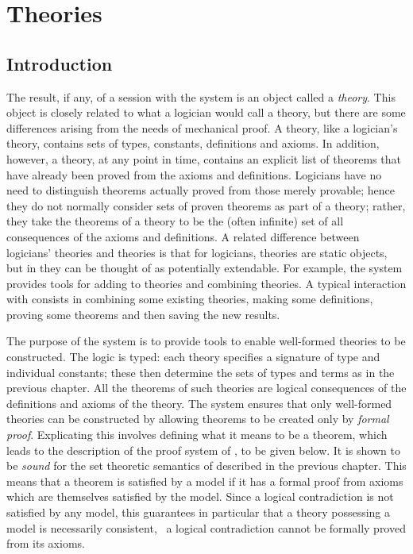 \chapter{Theories}\label{semantics}

\section{Introduction}

The result, if any, of a session with the \HOL{} system is an object
called a {\it theory\/}.  This object is closely related to what a
logician would call a theory, but there are some differences arising
from the needs of mechanical proof.  A \HOL{} theory, like a logician's
theory, contains sets of types, constants, definitions and axioms.  In
addition, however, a \HOL{} theory, at any point in time, contains an
explicit list of theorems that have already been proved from the
axioms and definitions. Logicians have no need to distinguish theorems
actually proved from those merely provable; hence they do not normally
consider sets of proven theorems as part of a theory; rather, they
take the theorems of a theory to be the (often infinite) set of all
consequences of the axioms and definitions.  A related difference
between logicians' theories and \HOL{} theories is that for logicians,
theories are static objects, but in \HOL{} they can be thought of as
potentially extendable. For example, the \HOL{} system provides tools
for adding to theories and combining theories.  A typical interaction
with \HOL{} consists in combining some existing theories, making some
definitions, proving some theorems and then saving the new results.

The purpose of the \HOL{} system is to provide tools to enable
well-formed theories to be constructed.  The \HOL{} logic is typed:
each theory specifies a signature of type and individual constants;
these then determine the sets of types and terms as in the previous
chapter.  All the theorems of such theories are logical consequences
of the definitions and axioms of the theory.  The \HOL{} system ensures
that only well-formed theories can be constructed by allowing theorems
to be created only by {\it formal proof\/}. Explicating this involves
defining what it means to be a theorem, which leads to the description
of the proof system of \HOL, to be given below. It is shown to be {\em
sound\/} for the set theoretic semantics of \HOL{} described in the
previous chapter.  This means that a theorem is satisfied by a model
if it has a formal proof from axioms which are themselves satisfied by
the model. Since a logical contradiction is not satisfied by any
model, this guarantees in particular that a theory possessing a model
is necessarily consistent, \ie\ a logical contradiction cannot be
formally proved from its axioms.

